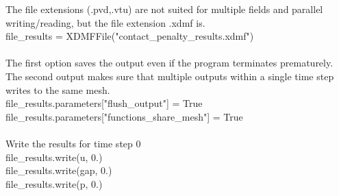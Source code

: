 \documentclass[12pt,3p]{article}
\begin{document}
The file extensions (.pvd,.vtu) are not suited for multiple fields and parallel writing/reading, but the file extension .xdmf is. \\
{\selectfont
file\_results = XDMFFile("contact\_penalty\_results.xdmf") \\ \\
}
The first option saves the output even if the program terminates prematurely. The second output makes sure that multiple outputs within a single time step writes to the same mesh. \\
{\selectfont
file\_results.parameters["flush\_output"] = True \\
file\_results.parameters["functions\_share\_mesh"] = True \\ \\
}
Write the results for time step 0 \\
{\selectfont
file\_results.write(u, 0.) \\
file\_results.write(gap, 0.) \\
file\_results.write(p, 0.) 
}
\end{document}
